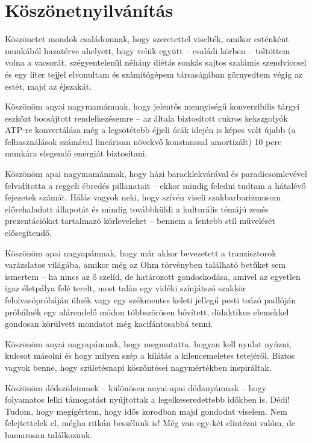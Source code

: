 \chapter*{Köszönetnyilvánítás}

Köszönetet mondok családomnak, hogy szeretettel viselték, amikor esténként munkából hazatérve ahelyett, hogy velük együtt -- családi körben -- töltöttem volna a vacsorát, szégyentelenül néhány diétás sonkás sajtos szalámis szendviccsel és egy liter tejjel elvonultam és számítógépem társaságában görnyedtem végig az estét, majd az éjszakát.

Köszönöm anyai nagymamámnak, hogy jelentős mennyiségű konverzibilis tárgyi eszközt bocsájtott rendelkezésemre -- az általa biztosított cukros kekszgolyók ATP-re konvertálása még a legsötétebb éjjeli órák idején is képes volt újabb (a felhasználások számával lineárisan növekvő konstanssal amortizált) 10 perc munkára elegendő energiát biztosítani.

Köszönöm apai nagymamámnak, hogy házi baracklekvárával és paradicsomlevével felvidította a reggeli ébredés pillanatait -- ekkor mindig feledni tudtam a hátalévő fejezetek számát. Hálás vagyok neki, hogy szívén viseli szakbarbarizmusom előrehaladott állapotát és mindig továbbküldi a kulturális témájú zenés prezentációkat tartalmazó körleveleket -- bennem a fentebb stíl művelését elősegítendő.

Köszönöm apai nagyapámnak, hogy már akkor bevezetett a tranzisztorok varázslatos világába, amikor még az Ohm törvényben található betűket sem ismertem -- ha nincs az ő szelíd, de határozott gondoskodása, amivel az egyetlen igaz életpálya felé terelt, most talán egy vidéki színjátszó szakkör felolvasópróbáján ülnék vagy egy székmentes keleti jellegű pesti teázó padlóján próbálnék egy alárendelő módon többszörösen bővített, didaktikus elemekkel gondosan körülvett mondatot még kacifántosabbá tenni.

Köszönöm anyai nagyapámnak, hogy megmutatta, hogyan kell nyulat nyúzni, kulcsot másolni és hogy milyen szép a kilátás a kilencemeletes tetejéről. Biztos vagyok benne, hogy születésnapi köszöntései nagymértékben inspiráltak.

Köszönöm dédszüleimnek -- különösen anyai-apai dédanyámnak -- hogy folyamatos lelki támogatást nyújtottak a legelkeseredettebb időkben is. Dédi! Tudom, hogy megígértem, hogy idős korodban majd gondodat viselem. Nem felejtettelek el, mégha ritkán beszélünk is! Még van egy-két elintézni valóm, de hamarosan találkozunk.

